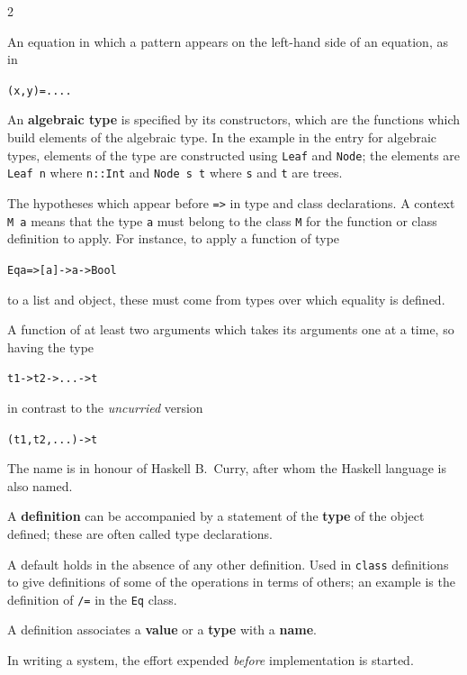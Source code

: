 \begin{multicols}{2}
{
An equation in which a pattern appears on the left-hand side of an equation,
as in
\begin{alltt}
(x,y) = ....
\end{alltt}

An \textbf{algebraic type} is specified by its constructors, which are the
functions which build elements of the algebraic type. 
\itempar
In the example in the
entry for algebraic types, elements of the type are constructed using 
\texttt{Leaf} and \texttt{Node}; the elements are \texttt{Leaf n} where \texttt{n::Int} and
\texttt{Node s t} where \texttt{s} and \texttt{t} are trees.

The hypotheses which appear before \texttt{=>} in type and class declarations. A
context \texttt{M a} means that the type \texttt{a} must belong to the class \texttt{M}
for the function or class definition to apply. For instance, to apply a
function of type
\begin{alltt}
Eq a => [a] -> a -> Bool
\end{alltt}
to a list and object, these must come from types over which equality is
defined.

 
A function of at least two arguments which takes its arguments one at a time, so
having
the type
\begin{alltt}
t1 -> t2 -> ... -> t
\end{alltt}
in contrast to the {\em uncurried\/} version
\begin{alltt}
(t1,t2,...) -> t
\end{alltt}
The name is in honour of Haskell B.\ Curry, after whom the Haskell language is
also named.

A \textbf{definition} can be accompanied by a statement of the \textbf{type} of
the object defined; these are often called type declarations.  

A default holds in the absence of any other definition. Used in \texttt{class}
definitions to give  definitions of some of the operations in
terms of others; an example is the definition of \texttt{/=} in
the \texttt{Eq} class.

A definition associates a \textbf{value} or a \textbf{type} with a \textbf{name}.

In writing a system, the effort expended {\em before\/} implementation is
started.

}
\end{multicols}
